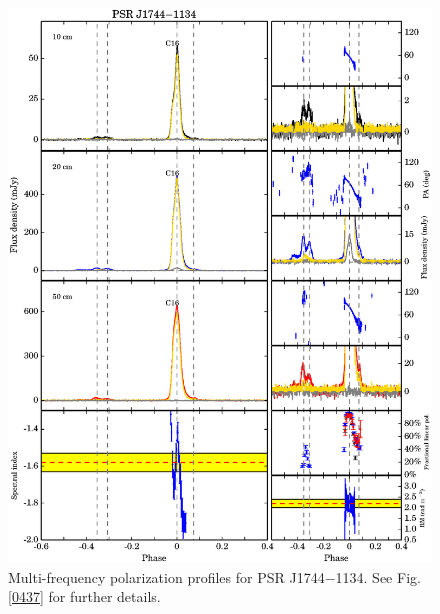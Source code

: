 \documentclass[useAMS,usenatbib]{mn2e}
\begin{document}
\begin{appendices}
\begin{figure}
\begin{center}
\includegraphics[width=6 in]{1744.ps}
\caption{Multi-frequency polarization profiles for PSR J1744$-$1134. 
See Fig. \ref{0437} for further details.}
\label{1744}
\end{center}
\end{figure}


\end{appendices}
\end{document}
